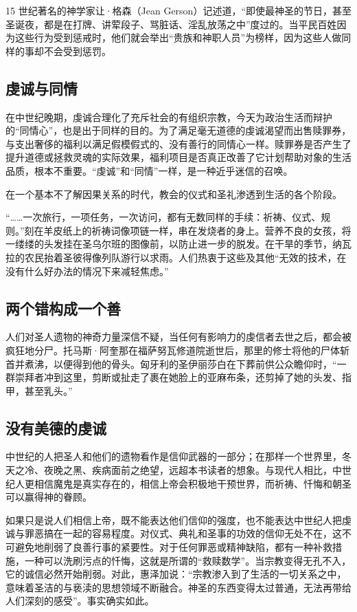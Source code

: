 15 世纪著名的神学家让·格森（Jean Gerson）记述道，“即使最神圣的节日，甚至圣诞夜，都是在打牌、讲荤段子、骂脏话、淫乱放荡之中”度过的。当平民百姓因为这些行为受到惩戒时，他们就会举出“贵族和神职人员”为榜样，因为这些人做同样的事却不会受到惩罚。

\subsection{虔诚与同情}
在中世纪晚期，虔诚合理化了充斥社会的有组织宗教，今天为政治生活而辩护的“同情心”，也是出于同样的目的。为了满足毫无道德的虔诚渴望而出售赎罪券，与支出奢侈的福利以满足假模假式的、没有善行的同情心一样。赎罪券是否产生了提升道德或拯救灵魂的实际效果，福利项目是否真正改善了它计划帮助对象的生活品质，根本不重要。“虔诚”和“同情”一样，是一种近乎迷信的召唤。

在一个基本不了解因果关系的时代，教会的仪式和圣礼渗透到生活的各个阶段。

“……一次旅行，一项任务，一次访问，都有无数同样的手续：祈祷、仪式、规则。”刻在羊皮纸上的祈祷词像项链一样，串在发烧者的身上。营养不良的女孩，将一缕缕的头发挂在圣乌尔班的图像前，以防止进一步的脱发。在干旱的季节，纳瓦拉的农民抬着圣彼得像列队游行以求雨。人们热衷于这些及其他“无效的技术，在没有什么好办法的情况下来减轻焦虑。”

\subsection{两个错构成一个善}
人们对圣人遗物的神奇力量深信不疑，当任何有影响力的虔信者去世之后，都会被疯狂地分尸。托马斯·阿奎那在福萨努瓦修道院逝世后，那里的修士将他的尸体斩首并煮沸，以便得到他的骨头。匈牙利的圣伊丽莎白在下葬前供公众瞻仰时，“一群崇拜者冲到这里，剪断或扯走了裹在她脸上的亚麻布条，还剪掉了她的头发、指甲，甚至乳头。”

\subsection{没有美德的虔诚}
中世纪的人把圣人和他们的遗物看作是信仰武器的一部分；在那样一个世界里，冬天之冷、夜晚之黑、疾病面前之绝望，远超本书读者的想象。与现代人相比，中世纪人更相信魔鬼是真实存在的，相信上帝会积极地干预世界，而祈祷、忏悔和朝圣可以赢得神的眷顾。

如果只是说人们相信上帝，既不能表达他们信仰的强度，也不能表达中世纪人把虔诚与罪恶搞在一起的容易程度。对仪式、典礼和圣事的功效的信仰无处不在，这不可避免地削弱了良善行事的紧要性。对于任何罪恶或精神缺陷，都有一种补救措施，一种可以洗刷污点的忏悔，这就是所谓的“救赎数学”。当宗教变得无孔不入，它的诚信必然开始削弱。对此，惠泽加说：“宗教渗入到了生活的一切关系之中，意味着圣洁的与亵渎的思想领域不断融合。神圣的东西变得太过普通，无法再带给人们深刻的感受”。事实确实如此。

